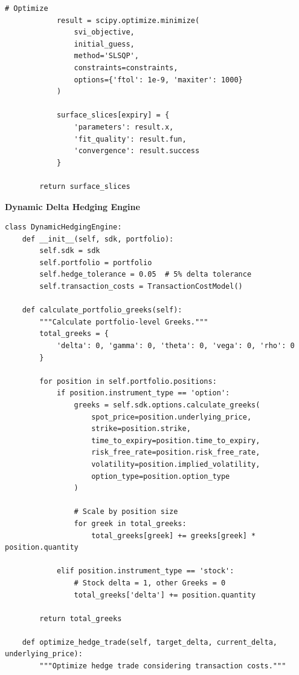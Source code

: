 \documentclass[12pt,a4paper]{article}
\theoremstyle{definition}
\theoremstyle{remark}
\begin{document}
\begin{lstlisting}[caption=Real-Time Volatility Surface Engine]
            # Optimize
            result = scipy.optimize.minimize(
                svi_objective,
                initial_guess,
                method='SLSQP',
                constraints=constraints,
                options={'ftol': 1e-9, 'maxiter': 1000}
            )
            
            surface_slices[expiry] = {
                'parameters': result.x,
                'fit_quality': result.fun,
                'convergence': result.success
            }
        
        return surface_slices
\end{lstlisting}

\textbf{Dynamic Delta Hedging Engine}

\begin{lstlisting}[caption=Real-Time Delta Hedging]
class DynamicHedgingEngine:
    def __init__(self, sdk, portfolio):
        self.sdk = sdk
        self.portfolio = portfolio
        self.hedge_tolerance = 0.05  # 5% delta tolerance
        self.transaction_costs = TransactionCostModel()
        
    def calculate_portfolio_greeks(self):
        """Calculate portfolio-level Greeks."""
        total_greeks = {
            'delta': 0, 'gamma': 0, 'theta': 0, 'vega': 0, 'rho': 0
        }
        
        for position in self.portfolio.positions:
            if position.instrument_type == 'option':
                greeks = self.sdk.options.calculate_greeks(
                    spot_price=position.underlying_price,
                    strike=position.strike,
                    time_to_expiry=position.time_to_expiry,
                    risk_free_rate=position.risk_free_rate,
                    volatility=position.implied_volatility,
                    option_type=position.option_type
                )
                
                # Scale by position size
                for greek in total_greeks:
                    total_greeks[greek] += greeks[greek] * position.quantity
            
            elif position.instrument_type == 'stock':
                # Stock delta = 1, other Greeks = 0
                total_greeks['delta'] += position.quantity
        
        return total_greeks
    
    def optimize_hedge_trade(self, target_delta, current_delta, underlying_price):
        """Optimize hedge trade considering transaction costs."""
        

\end{lstlisting}
\end{document}
